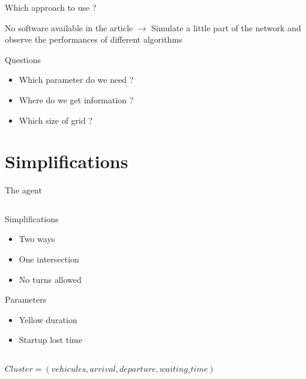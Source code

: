 \documentclass[]{beamer}
\begin{document}
\begin{frame}{Which approach to use ?}
 \begin{block}{No software available in the article}
 $\rightarrow$ Simulate a little part of the network and observe the performances of different algorithms
 \end{block}
 
 \begin{block}{Questions}
  \begin{itemize}
   \item Which parameter do we need ?
   \item Where do we get information ?
   \item Which size of grid ?
  \end{itemize} 
 \end{block}
\end{frame}

\section{Simplifications}
\begin{frame}{The agent}

 \begin{columns}
  \begin{column}[c]{4cm}
  Simplifications
   \begin{itemize}
    \item Two ways
    \item One intersection
    \item No turns allowed
   \end{itemize}
   Parameters
   \begin{itemize}
    \item Yellow duration
    \item Startup lost time
   \end{itemize}
  \end{column}
  \begin{column}[c]{6cm}
   \begin{figure}
   \end{figure}
  \end{column}
 \end{columns}
 \vspace{1cm}
 
 \centering
 $Cluster = (vehicules, arrival, departure, waiting\_time)$
\end{frame}
\end{document}
